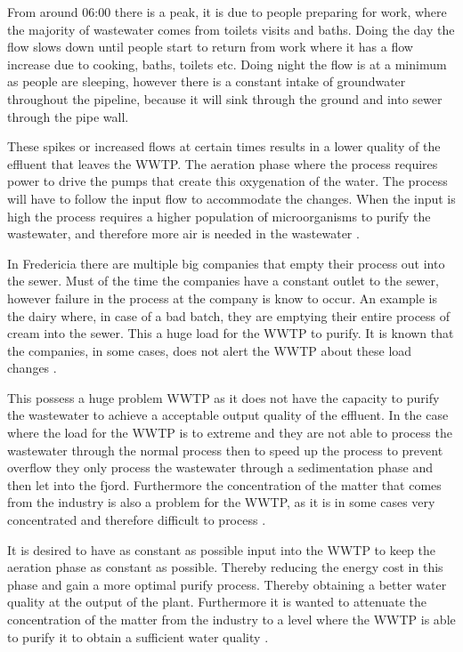 From around 06:00 there is a peak, it is due to people preparing for work, where the majority of wastewater comes from toilets visits and baths. Doing the day the flow slows down until people start to return from work where it has a flow increase due to cooking, baths, toilets etc. Doing night the flow is at a minimum as people are sleeping, however there is a constant intake of groundwater throughout the pipeline, because it will sink through the ground and into sewer through the pipe wall.  

These spikes or increased flows at certain times results in a lower quality of the effluent that leaves the WWTP. The aeration phase where the process requires power to drive the pumps that create this oxygenation of the water. The process will have to follow the input flow to accommodate the changes. When the input is high the process requires a higher population of microorganisms to purify the wastewater, and therefore more air is needed in the wastewater \cite{fredericia_spildevand_mode}. 

In Fredericia there are multiple big companies that empty their process out into the sewer. Must of the time the companies have a constant outlet to the sewer, however failure in the process at the company is know to occur. An example is the dairy where, in case of a bad batch, they are emptying their entire process of cream into the sewer. This a huge load for the WWTP to purify. It is known that the companies, in some cases, does not alert the WWTP about these load changes \cite{fredericia_spildevand_mode}. 

This possess a huge problem WWTP as it does not have the capacity to purify the wastewater to achieve a acceptable output quality of the effluent. In the case where the load for the WWTP is to extreme and they are not able to process the wastewater through the normal process then to speed up the process to prevent overflow they only process the wastewater through a sedimentation phase and then let into the fjord. Furthermore the concentration of the matter that comes from the industry is also a problem for the WWTP, as it is in some cases very concentrated and therefore difficult to process \cite{fredericia_spildevand_mode}.  

It is desired to have as constant as possible input into the WWTP to keep the aeration phase as constant as possible. Thereby reducing the energy cost in this phase and gain a more optimal purify process. Thereby obtaining a better water quality at the output of the plant. Furthermore it is wanted to attenuate the concentration of the matter from the industry to a level where the WWTP is able to purify it to obtain a sufficient water quality \cite{fredericia_spildevand_mode}. 

